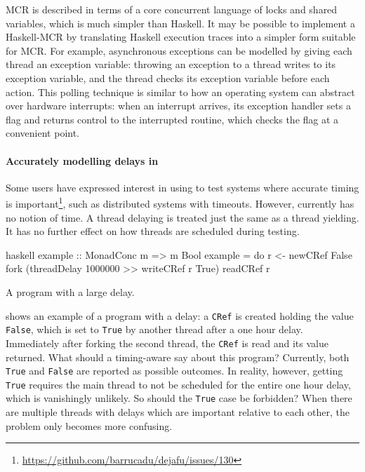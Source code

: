 MCR is described in terms of a core concurrent language of locks and
shared variables, which is much simpler than Haskell.  It may be
possible to implement a Haskell-MCR by translating Haskell execution
traces into a simpler form suitable for MCR\@.  For example,
asynchronous exceptions can be modelled by giving each thread an
exception variable: throwing an exception to a thread writes to its
exception variable, and the thread checks its exception variable
before each action.  This polling technique is similar to how an
operating system can abstract over hardware interrupts: when an
interrupt arrives, its exception handler sets a flag and returns
control to the interrupted routine, which checks the flag at a
convenient point.

\paragraph{Accurately modelling delays in \dejafu{}}
Some users have expressed interest in using \dejafu{} to test systems
where accurate timing is
important\footnote{\url{https://github.com/barrucadu/dejafu/issues/130}},
such as distributed systems with timeouts.  However, \dejafu{}
currently has no notion of time.  A thread delaying is treated just
the same as a thread yielding.  It has no further effect on how
threads are scheduled during testing.

\begin{listing}
\centering
\begin{cminted}{haskell}
example :: MonadConc m => m Bool
example = do
    r <- newCRef False
    fork (threadDelay 1000000 >> writeCRef r True)
    readCRef r
\end{cminted}
\caption{A program with a large delay.}\label{lst:unreasonable}
\end{listing}

 shows an example of a program with a delay: a
\verb|CRef| is created holding the value \verb|False|, which is set to
\verb|True| by another thread after a one hour delay.  Immediately
after forking the second thread, the \verb|CRef| is read and its value
returned.  What should a timing-aware \dejafu{} say about this
program?  Currently, both \verb|True| and \verb|False| are reported as
possible outcomes.  In reality, however, getting \verb|True| requires
the main thread to not be scheduled for the entire one hour delay,
which is vanishingly unlikely.  So should the \verb|True| case be
forbidden?  When there are multiple threads with delays which are
important relative to each other, the problem only becomes more
confusing.

